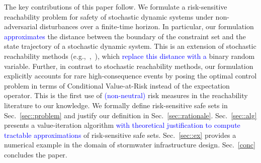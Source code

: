 \documentclass[letterpaper, 10 pt, conference]{ieeeconf}  %
\begin{document}
The key contributions of this paper follow.
We formulate a risk-sensitive reachability problem for safety of stochastic dynamic systems under non-adversarial disturbances
over a finite-time horizon. In particular, our formulation \textcolor{blue}{approximates} the distance between the boundary of the constraint set and the
state trajectory of a stochastic dynamic system. This is an extension of stochastic 
reachability methods (e.g.,~\cite{abate2008probabilistic},~\cite{summers2010verification}), which \textcolor{blue}{replace this distance with a} binary random variable.
Further, in contrast to stochastic reachability methods, our formulation explicitly accounts for rare high-consequence events by posing the optimal control problem
in terms of Conditional Value-at-Risk instead of the expectation operator. This is the first use of \textcolor{blue}{(non-neutral)} risk measures in the reachability literature to our knowledge.
We formally define risk-sensitive safe sets in Sec.~\ref{sec::problem} and justify our definition in Sec.~\ref{sec::rationale}.
Sec.~\ref{sec::alg} presents a value-iteration algorithm \textcolor{blue}{with theoretical justification to compute tractable approximations} of risk-sensitive safe sets.
Sec.~\ref{sec::ex} provides a numerical example in the domain of stormwater infrastructure design. Sec.~\ref{conc} concludes the paper.

\end{document}
